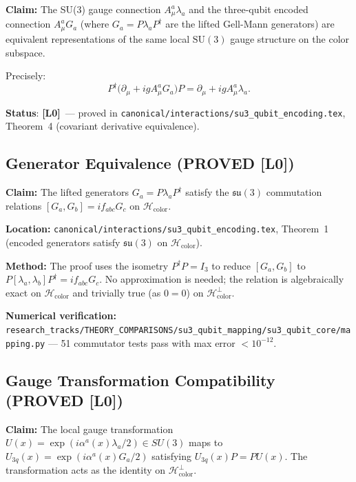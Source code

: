 \documentclass[11pt,a4paper]{article}
\newcommand{\Lzero}{\textbf{[L0]}}
\begin{document}
\begin{tcolorbox}[colback=blue!5!white,colframe=blue!40!black,
  title=Main equivalence claim]
\textbf{Claim:} The SU(3) gauge connection $A_\mu^a \lambda_a$ and the
three-qubit encoded connection $A_\mu^a G_a$ (where $G_a = P\lambda_a P^\dagger$
are the lifted Gell-Mann generators) are equivalent representations of the same
local $\mathrm{SU}(3)$ gauge structure on the color subspace.

\medskip\noindent Precisely:
\[
  P^\dagger \bigl(\partial_\mu + ig A_\mu^a G_a\bigr) P
  = \partial_\mu + ig A_\mu^a \lambda_a.
\]

\medskip\noindent\textbf{Status}: \Lzero\ — proved in
\texttt{canonical/interactions/su3\_qubit\_encoding.tex},
Theorem~4 (covariant derivative equivalence).
\end{tcolorbox}

\subsection{Generator Equivalence (PROVED \Lzero)}
\label{sec:bridges:su3_gauge_qubit:generators}

\textbf{Claim:} The lifted generators $G_a = P\lambda_a P^\dagger$ satisfy the
$\mathfrak{su}(3)$ commutation relations $[G_a, G_b] = if_{abc} G_c$ on
$\mathcal{H}_{\mathrm{color}}$.

\textbf{Location:}
\texttt{canonical/interactions/su3\_qubit\_encoding.tex},
Theorem~1 (encoded generators satisfy $\mathfrak{su}(3)$ on $\mathcal{H}_{\mathrm{color}}$).

\textbf{Method:} The proof uses the isometry $P^\dagger P = I_3$ to reduce
$[G_a, G_b]$ to $P[\lambda_a, \lambda_b]P^\dagger = if_{abc} G_c$.
No approximation is needed; the relation is algebraically exact on
$\mathcal{H}_{\mathrm{color}}$ and trivially true (as $0 = 0$) on
$\mathcal{H}_{\mathrm{color}}^\perp$.

\textbf{Numerical verification:}
\texttt{research\_tracks/THEORY\_COMPARISONS/su3\_qubit\_mapping/su3\_qubit\_core/mapping.py}
— 51 commutator tests pass with max error $< 10^{-12}$.

\subsection{Gauge Transformation Compatibility (PROVED \Lzero)}
\label{sec:bridges:su3_gauge_qubit:gauge_transform}

\textbf{Claim:} The local gauge transformation
$U(x) = \exp(i\alpha^a(x)\lambda_a/2) \in SU(3)$
maps to $U_{3q}(x) = \exp(i\alpha^a(x)G_a/2)$ satisfying
$U_{3q}(x) P = P U(x)$.  The transformation acts as the identity on
$\mathcal{H}_{\mathrm{color}}^\perp$.
\end{document}
